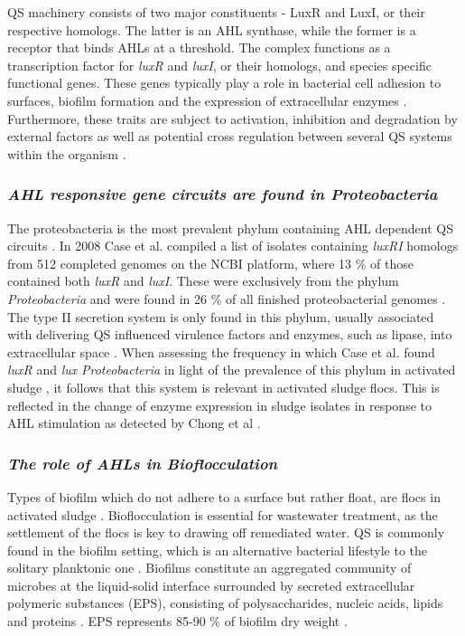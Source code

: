 \documentclass[11pt]{article}
\begin{document}
QS machinery consists of two major constituents - LuxR and LuxI, or their respective homologs. The latter is an AHL synthase, while the former is a receptor that binds AHLs at a threshold. The complex functions as a transcription factor for \textit{luxR} and \textit{luxI}, or their homologs, and species specific functional genes. These genes typically play a role in bacterial cell adhesion to surfaces, biofilm formation and the expression of extracellular enzymes \cite{Flemming_10}.
Furthermore, these traits are subject to activation, inhibition and degradation by external factors as well as potential cross regulation between several QS systems within the organism \cite{juhas2005}.


\subsubsection{\emph{AHL responsive gene circuits are found in Proteobacteria}}
The proteobacteria is the most prevalent phylum containing AHL dependent QS circuits \cite{gelencser_12}. In 2008 Case et al. compiled a list of isolates containing \emph{luxRI} homologs from 512 completed genomes on the NCBI platform, where 13 \% of those contained both \emph{luxR} and \emph{luxI}. These were exclusively from the phylum \emph{Proteobacteria} and were found in 26 \% of all finished proteobacterial genomes \cite{case_08}.
The type II secretion system is only found in this phylum, usually associated with delivering QS influenced virulence factors and enzymes, such as lipase, into extracellular space \cite{sandkvist2001}. 
When assessing the frequency in which Case et al. found \emph{luxR} and \emph{lux} \emph{Proteobacteria} \cite{case_08} in light of the prevalence of this phylum in activated sludge \cite{Wagner_02,Hesham_11}, it follows that this system is relevant in activated sludge flocs. This is reflected in the change of enzyme expression in sludge isolates in response to AHL stimulation as detected by Chong et al \cite{Chong_12}. 

\subsubsection{\emph{The role of AHLs in Bioflocculation}}
Types of biofilm which do not adhere to a surface but rather float, are flocs in activated sludge \cite{wingender1999}. Bioflocculation is essential for wastewater treatment, as the settlement of the flocs is key to drawing off remediated water. QS is commonly found in the biofilm setting, which is an alternative bacterial lifestyle to the solitary planktonic one \cite{webb2003}. Biofilms constitute an aggregated community of microbes at the liquid-solid interface surrounded by secreted extracellular polymeric substances (EPS), consisting of polysaccharides, nucleic acids, lipids and proteins \cite{wingender1999}. EPS represents 85-90 \% of biofilm dry weight \cite{Frolund_96}.
\end{document}
